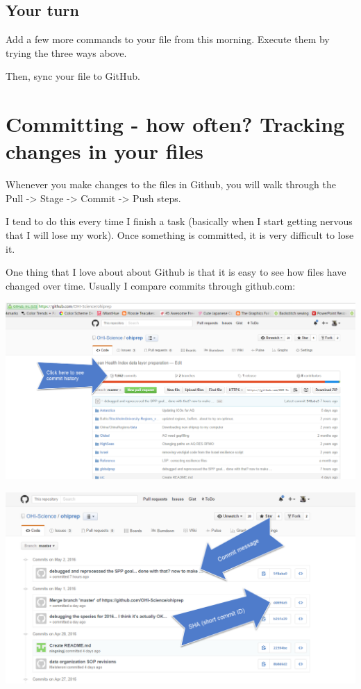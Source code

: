 \documentclass[]{book}
\theoremstyle{definition}
\theoremstyle{definition}
\theoremstyle{definition}
\theoremstyle{remark}
\begin{document}
\subsection{Your turn}\label{your-turn-4}

Add a few more commands to your file from this morning. Execute them by
trying the three ways above.

Then, sync your file to GitHub.

\section{Committing - how often? Tracking changes in your
files}\label{committing---how-often-tracking-changes-in-your-files}

Whenever you make changes to the files in Github, you will walk through
the Pull -\textgreater{} Stage -\textgreater{} Commit -\textgreater{}
Push steps.

I tend to do this every time I finish a task (basically when I start
getting nervous that I will lose my work). Once something is committed,
it is very difficult to lose it.

One thing that I love about about Github is that it is easy to see how
files have changed over time. Usually I compare commits through
github.com:

\includegraphics{img/commit_history.png}

\includegraphics{img/commit_compare_2.png}
\end{document}
